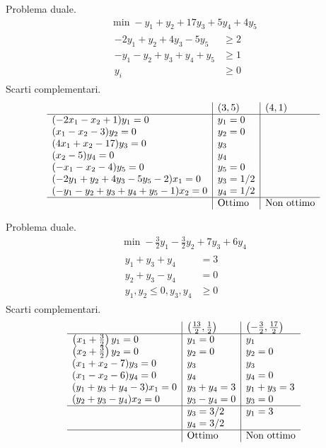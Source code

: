 Problema duale.
\begin{gather*}
\min -y_{1} +y_{2} +17y_{3} +5y_{4} +4y_{5}\\
\begin{aligned}
-2y_{1} +y_{2} +4y_{3} -5y_{5} & \geq 2\\
-y_{1} -y_{2} +y_{3} +y_{4} +y_{5} & \geq 1\\
y_{i} & \geq 0
\end{aligned}
\end{gather*}
Scarti complementari.
\begin{equation*}
\begin{array}{ l|l|l }
 & ( 3,5) & ( 4,1)\\
\hline
( -2x_{1} -x_{2} +1) y_{1} =0 & y_{1} =0 & \\
( x_{1} -x_{2} -3) y_{2} =0 & y_{2} =0 & \\
( 4x_{1} +x_{2} -17) y_{3} =0 & y_{3} & \\
( x_{2} -5) y_{4} =0 & y_{4} & \\
( -x_{1} -x_{2} -4) y_{5} =0 & y_{5} =0 & \\
( -2y_{1} +y_{2} +4y_{3} -5y_{5} -2) x_{1} =0 & y_{3} =1/2 & \\
( -y_{1} -y_{2} +y_{3} +y_{4} +y_{5} -1) x_{2} =0 & y_{4} =1/2 & \\
\hline
 & \text{Ottimo} & \text{Non ottimo}
\end{array}
\end{equation*}
\Es

Problema duale.
\begin{gather*}
\min -\frac{3}{2} y_{1} -\frac{3}{2} y_{2} +7y_{3} +6y_{4}\\
\begin{aligned}
y_{1} +y_{3} +y_{4} & =3\\
y_{2} +y_{3} -y_{4} & =0\\
y_{1} ,y_{2} \leq 0,y_{3} ,y_{4} & \geq 0
\end{aligned}
\end{gather*}
Scarti complementari.
\begin{equation*}
\begin{array}{ l|l|l }
 & \left(\frac{13}{2} ,\frac{1}{2}\right) & \left( -\frac{3}{2} ,\frac{17}{2}\right)\\
\hline
\left( x_{1} +\frac{3}{2}\right) y_{1} =0 & y_{1} =0 & y_{1}\\
\left( x_{2} +\frac{3}{2}\right) y_{2} =0 & y_{2} =0 & y_{2} =0\\
( x_{1} +x_{2} -7) y_{3} =0 & y_{3} & y_{3}\\
( x_{1} -x_{2} -6) y_{4} =0 & y_{4} & y_{4} =0\\
( y_{1} +y_{3} +y_{4} -3) x_{1} =0 & y_{3} +y_{4} =3 & y_{1} +y_{3} =3\\
( y_{2} +y_{3} -y_{4}) x_{2} =0 & y_{3} -y_{4} =0 & y_{3} =0\\
\hline
 & y_{3} =3/2 & y_{1} =3\\
 & y_{4} =3/2 & \\
\hline
 & \text{Ottimo} & \text{Non ottimo}
\end{array}
\end{equation*}
\Es

